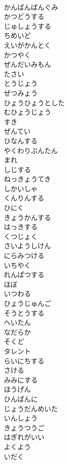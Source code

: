 \documentclass[8pt]{extreport}
\begin{document}
\begin{CJK}{UTF8}{min}
\\	かんばんばんぐみ
\\	かつどうする
\\	じゅしょうする
\\	ちめいど
\\	えいがかんとく
\\	かつやく
\\	ぜんだいみもん
\\	たさい
\\	とうじょう
\\	ぜつみょう
\\	ひょうひょうとした
\\	むひょうじょう
\\	すき
\\	ぜんてい
\\	ひなんする
\\	やくわりぶんたん
\\	まれ
\\	しじする
\\	ねっきょうてき
\\	しかいしゃ
\\	くんりんする
\\	ひにく
\\	きょうかんする
\\	はっきする
\\	くつじょく
\\	さいようしけん
\\	にらみつける
\\	いちやく
\\	れんぱつする
\\	ほぼ
\\	いつわる
\\	ひょうじゅんご
\\	そうとうする
\\	へいたん
\\	なだらか
\\	そくど
\\	タレント
\\	らいにちする
\\	さける
\\	みみにする
\\	ほうげん
\\	ひんぱんに
\\	じょうだんめいた
\\	いんしょう
\\	きょうつうご
\\	はぎれがいい
\\	よくよう
\\	いだく

\end{CJK}
\end{document}
